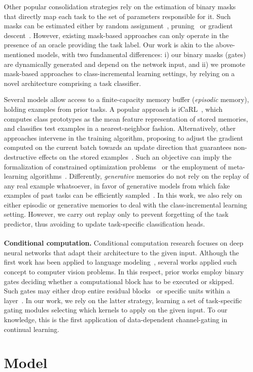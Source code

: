 \documentclass[10pt,twocolumn,letterpaper]{article}
\begin{document}
Other popular consolidation strategies rely on the estimation of binary masks that directly map each task to the set of parameters responsible for it. Such masks can be estimated either by random assignment~\cite{xdg}, pruning~\cite{packnet} or gradient descent~\cite{piggyback,hat}. However, existing mask-based approaches can only operate in the presence of an oracle providing the task label. 
Our work is akin to the above-mentioned models, with two fundamental differences: i) our binary masks (gates) are dynamically generated and depend on the network input, and ii) we promote mask-based approaches to class-incremental learning settings, by relying on a novel architecture comprising a task classifier.

Several models allow access to a finite-capacity memory buffer (\textit{episodic} memory), holding examples from prior tasks. A popular approach is iCaRL~\cite{icarl}, which computes class prototypes as the mean feature representation of stored memories, and classifies test examples in a nearest-neighbor fashion. Alternatively, other approaches intervene in the training algorithm, proposing to adjust the gradient computed on the current batch towards an update direction that guarantees non-destructive effects on the stored examples~\cite{gem,agem,mer}. Such an objective can imply the formalization of constrained optimization problems~\cite{gem,agem} or the employment of meta-learning algorithms~\cite{mer}. Differently, \textit{generative} memories do not rely on the replay of any real example whatsoever, in favor of generative models from which fake examples of past tasks can be efficiently sampled~\cite{shin2017continual,wu2018memory,ostapenko2019learning}. 
In this work, we also rely on either episodic or generative memories to deal with the class-incremental learning setting. However, we carry out replay only to prevent forgetting of the task predictor, thus avoiding to update task-specific classification heads.
\\\\
\textbf{Conditional computation.}
Conditional computation research focuses on deep neural networks that adapt their architecture to the given input. Although the first work has been applied to language modeling~\cite{moe}, several works applied such concept to computer vision problems. In this respect, prior works employ binary gates deciding whether a computational block has to be executed or skipped. 
Such gates may either drop entire residual blocks~\cite{aig,skipnet} or specific units within a layer~\cite{gaternet,babak}.
In our work, we rely on the latter strategy, learning a set of task-specific gating modules selecting which kernels to apply on the given input. To our knowledge, this is the first application of data-dependent channel-gating in continual learning. \section{Model}
\def\x{{\bf x}}
\def\y{{\bf y}}
\def\t{{\bf t}}
\def\p{p_{\theta}}
\end{document}

